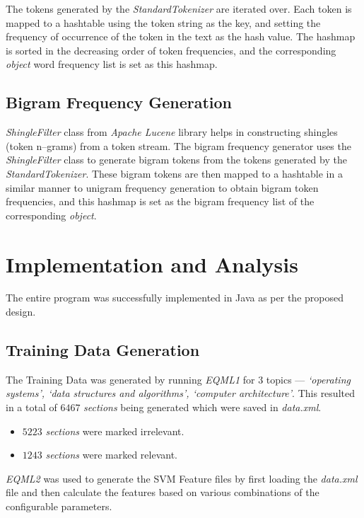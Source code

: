 \documentclass[a4paper,10pt]{report}
\begin{document}
The tokens generated by the \emph{StandardTokenizer} are iterated over. Each token is mapped to a hashtable using the token string 
as the key, and setting the frequency of occurrence of the token in the text as the hash value. 
The hashmap is sorted in the decreasing order of token frequencies, and the corresponding \emph{object} word frequency list is set as this hashmap.

\section{Bigram Frequency Generation}

\emph{ShingleFilter} class from \emph{Apache Lucene} library helps in constructing shingles (token n--grams) from a token stream. 
The bigram frequency generator uses the \emph{ShingleFilter} class to generate bigram tokens from the tokens generated by the \emph{StandardTokenizer}.
These bigram tokens are then mapped to a hashtable in a similar manner to unigram frequency generation to obtain bigram token frequencies, and this hashmap is set as the bigram frequency list of the corresponding \emph{object}.


\chapter{Implementation and Analysis}

The entire program was successfully implemented in Java as per the proposed design.

\section{Training Data Generation}

The Training Data was generated by running \emph{EQML1} for 3 topics --- \emph{`operating systems', `data structures and algorithms', `computer architecture'}. 
This resulted in a total of $6467$ \emph{sections} being generated which were saved in \emph{data.xml}.

\begin{itemize}
\item $5223$ \emph{sections} were marked irrelevant.
\item $1243$ \emph{sections} were marked relevant.
\end{itemize}

\noindent \emph{EQML2} was used to generate the SVM Feature files by first loading the \emph{data.xml} file and then calculate the features based on various combinations of the configurable parameters.
\end{document}
